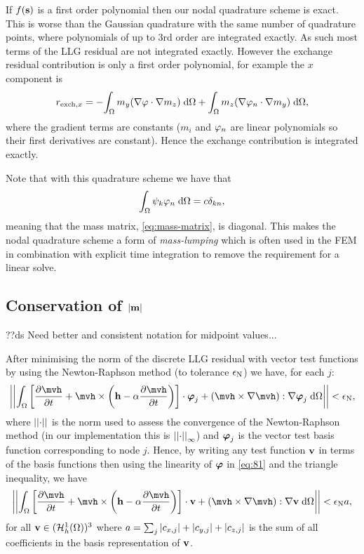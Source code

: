 If $f({\boldsymbol{\mathrm{s}}})$ is a first order polynomial then our nodal quadrature scheme is exact.
This is worse than the Gaussian quadrature with the same number of quadrature points, where polynomials of up to 3rd order are integrated exactly.
As such most terms of the LLG residual are not integrated exactly.
However the exchange residual contribution is only a first order polynomial, for example the $x$ component is
\begin{equation}
  \begin{aligned}
    r_{\text{exch},x} = - {\int_{\Omega} { m_y {\left( \nabla \varphi \cdot \nabla m_z \right)}} {\; \mathrm{{d}}} {\Omega}} + {\int_{\Omega} { m_z {\left( \nabla \varphi_n \cdot \nabla m_y \right)}} {\; \mathrm{{d}}} {\Omega}},
  \end{aligned}
\end{equation}
where the gradient terms are constants ($m_i$ and $\varphi_n$ are linear polynomials so their first derivatives are constant).
Hence the exchange contribution is integrated exactly.

Note that with this quadrature scheme we have that
\begin{equation}
  {\int_{\Omega} {\psi_k \varphi_n} {\; \mathrm{{d}}}{\Omega}} = c \delta_{kn},
\end{equation}
meaning that the mass matrix, \cref{eq:mass-matrix}, is diagonal.
This makes the nodal quadrature scheme a form of \emph{mass-lumping} which is often used in the FEM in combination with explicit time integration to remove the requirement for a linear solve.


\subsection{Conservation of $\left|{\boldsymbol{\mathrm{m}}} \right|$}
\label{sec:weak-cons-absmv}

??ds Need better and consistent notation for midpoint values...

After minimising the norm of the discrete LLG residual with vector test functions by using the Newton-Raphson method (to tolerance $\epsilon_{\mathrm{N}}$) we have, for each $j$:
\begin{equation}
  \norm{\intd{ \bigs{\dmdth  + \mvh \times \bigb{\hv - \dampc \dmdth}} \cdot \tbfv_j + \bigb{\mvh \times \grad \mvh} : \grad \tbfv_j}} < \ntol,
  \label{eq:81}
\end{equation}
where $\left| \left| \cdot \right| \right|$ is the norm used to assess the convergence of the Newton-Raphson method (in our implementation this is $\left| \left| \cdot \right| \right|_\infty$) and $\boldsymbol{\mathrm{\varphi}}_j$ is the vector test basis function corresponding to node $j$.
Hence, by writing any test function $\boldsymbol{\mathrm{v}}$ in terms of the basis functions then using the linearity of $\boldsymbol{\mathrm{\varphi}}$ in \cref{eq:81} and the triangle inequality, we have
\begin{equation}
  \norm{\intd{ \bigs{\dmdth + \mvh \times \bigb{\hv - \dampc \dmdth}} \cdot \testv + \bigb{\mvh \times \grad \mvh} : \grad \testv}} < \ntol  \sumbasiscoeff,
  \label{eq:82}
\end{equation}
for all $\boldsymbol{\mathrm{v}} \in ({\mathcal{H}^1_h(\Omega)})^3$ where $a = \sum_j  \left|{c_{x,j}} \right| + \left|{c_{y,j}} \right| + \left|{c_{z,j}} \right|$ is the sum of all coefficients in the basis representation of $\boldsymbol{\mathrm{v}}$.

